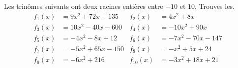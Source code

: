 

 \begin{exercice}\label{exo200}
 Les trinômes suivants ont deux racines entières entre $-10$ et $10$. Trouves les. 
\begin{align*}
f_{1}(x)&=9x^2+72x+135&f_{2}(x)&=4x^2+8x\\
f_{3}(x)&=10x^2-40x-600&f_{4}(x)&=-10x^2+90x\\
f_{5}(x)&=-4x^2-8x+12&f_{6}(x)&=-7x^2-70x-147\\
f_{7}(x)&=-5x^2+65x-150&f_{8}(x)&=-x^2+5x+24\\
f_{9}(x)&=-6x^2+216&f_{10}(x)&=-3x^2+18x+21
\end{align*}
\end{exercice}

